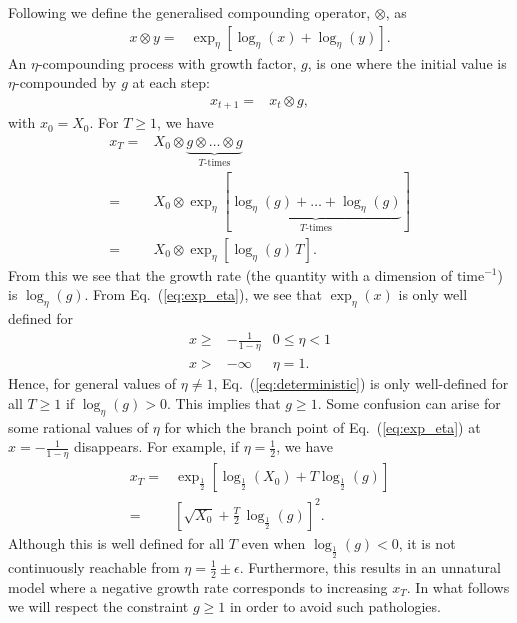 \documentclass[11pt]{article}
\begin{document}
\begin{multicols}{2}
Following \cite{carr2022generalized} we define the generalised compounding operator, $\otimes$, as
\begin{align}
x \otimes y = & \exp_\eta\left[ \log_\eta(x )+ \log_\eta(y)\right].
\end{align}
An $\eta$-compounding process with growth factor, $g$, is one where the initial value is $\eta$-compounded by $g$ at each step:
\begin{align}
x_{t+1} =& x_t \otimes g,
\end{align}
with $x_0 = X_0$. For $T\geq 1$, we have
\begin{align}
\nonumber x_T = & X_0 \otimes  \underbrace{  g\otimes \ldots \otimes g}_{T\text{-times}}\\
\nonumber =&  X_0 \otimes \exp_\eta \left[  \underbrace{  \log_\eta(g)+ \ldots + \log_\eta(g)}_{T\text{-times}}\right]\\
\label{eq:deterministic}=& X_0 \otimes \exp_\eta\left[\log_\eta(g)\,T \right].
\end{align}
From this we see that the growth rate (the quantity with a dimension of $\text{time}^{-1}$) is $\log_\eta(g)$. From Eq.~(\ref{eq:exp_eta}), we see that $\exp_\eta(x)$ is only well defined for
\begin{align*}
x \geq & -\frac{1}{1-\eta} &  \text{$0 \leq \eta < 1$}\\
x >  & -\infty & \text{$\eta=1$}.
\end{align*}
Hence, for general values of $\eta \neq 1$, Eq.~(\ref{eq:deterministic}) is only well-defined for all $T \geq 1$ if $\log_\eta(g) >0$. This implies that $g\geq 1$. 
Some confusion can arise for some rational values of $\eta$ for which the branch point of Eq.~(\ref{eq:exp_eta}) at $x = -\frac{1}{1-\eta}$ disappears. 
For example, if $\eta=\frac{1}{2}$, we have
\begin{align*}
x_T =& \exp_\frac{1}{2}\left[\log_\frac{1}{2}(X_0) + T \log_\frac{1}{2} (g)\right]\\
=& \left[ \sqrt{X_0} + \frac{T}{2}\,\log_\frac{1}{2} (g) \right]^2.
\end{align*}
Although this is well defined for all $T$ even when $\log_\frac{1}{2} (g) <0$, it is not continuously reachable from $\eta = \frac{1}{2} \pm \epsilon$.
Furthermore, this results in an unnatural model where a negative growth rate corresponds to increasing $x_T$. 
In what follows we will respect the constraint $g \geq 1$ in order to avoid such pathologies.



\end{multicols}
\end{document}
